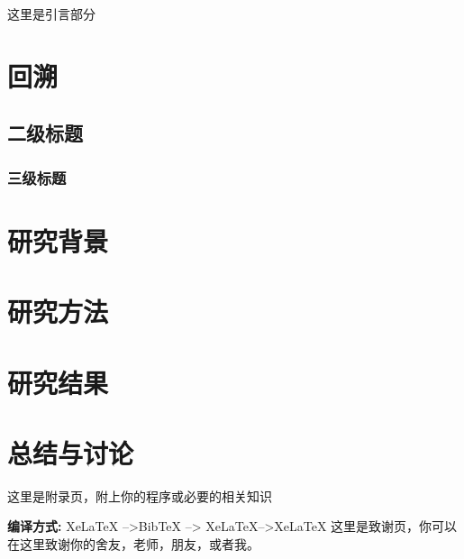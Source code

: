 \documentclass{LZUthesis}
\begin{document}
\tableofcontents

\renewcommand\listfigurename{插\ 图\ 目\ 录}
\renewcommand\listtablename{表\ 格\ 目\ 录}
\listoffigures
{}
\listoftables
\mainmatter

\Intro
这里是引言部分

\chapter{回溯}

\section{二级标题}
\subsection{三级标题}

\chapter{研究背景}

\chapter{研究方法}

\chapter{研究结果}

\chapter{总结与讨论}

\backmatter


\printbib




\Appendix


这里是附录页，附上你的程序或必要的相关知识\cite{partl2016}

{\bfseries 编译方式:} XeLaTeX -->BibTeX --> XeLaTeX-->XeLaTeX
\Thanks
这里是致谢页，你可以在这里致谢你的舍友，老师，朋友，或者我。
\end{document}
